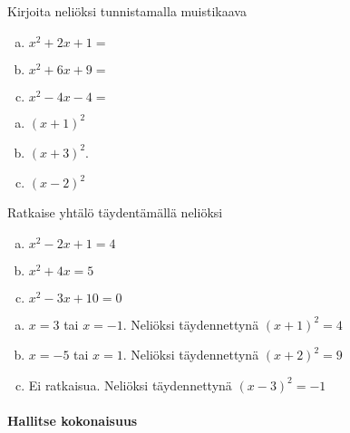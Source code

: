 \begin{tehtava}
    Kirjoita neliöksi tunnistamalla muistikaava
    \begin{enumerate}[a)]
        \item $x^2 +2x +1 =$
        \item $x^2 +6x +9 = $
        \item $x^2 -4x -4 = $
    \end{enumerate}
    \begin{vastaus}
        \begin{enumerate}[a)]
            \item $(x+1)^2$
            \item $(x+3)^2$.
            \item $(x-2)^2$     
        \end{enumerate}
    \end{vastaus}
\end{tehtava}

\begin{tehtava}
    Ratkaise yhtälö täydentämällä neliöksi
    \begin{enumerate}[a)]
        \item $x^2 -2x +1 = 4$
        \item $x^2 +4x = 5 $
        \item $x^2 -3x + 10 = 0 $
    \end{enumerate}
    \begin{vastaus}
        \begin{enumerate}[a)]
            \item $x = 3$ tai $x= -1$. Neliöksi täydennettynä $(x+1)^2=4$
            \item $x = -5$ tai $x = 1$. Neliöksi täydennettynä $(x+2)^2=9$
            \item Ei ratkaisua. Neliöksi täydennettynä $(x-3)^2=-1$   
        \end{enumerate}
    \end{vastaus}
\end{tehtava}

\paragraph*{Hallitse kokonaisuus}

